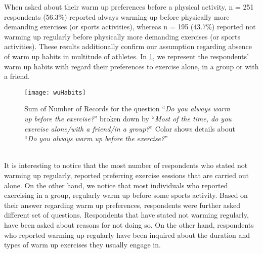 When asked about their warm up preferences before a physical activity, n = 251 respondents (56.3\%) reported always warming up before physically more demanding exercises (or sports activities), whereas n = 195 (43.7\%) reported not warming up regularly before physically more demanding exercises (or sports activities). These results additionally confirm our assumption regarding absence of warm up habits in multitude of athletes. In \ref{fig:wuHabits}, we represent the respondents' warm up habits with regard their preferences to exercise alone, in a group or with a friend. 
\begin{figure}[h]
    \centering
    \texttt{[image: wuHabits]}
    \caption{Sum of Number of Records for the question ``\textit{Do you always warm up before the exercise?}'' broken down by ``\textit{Most of the time, do you exercise alone/with a friend/in a group?}'' Color shows details about ``\textit{Do you always warm up before the exercise?}''}
    \label{fig:wuHabits}
\end{figure}\\
It is interesting to notice that the most number of respondents who stated not warming up regularly, reported preferring exercise sessions that are carried out alone. On the other hand, we notice that most individuals who reported exercising in a group, regularly warm up before some sports activity. Based on their answer regarding warm up preferences, respondents were further asked different set of questions. Respondents that have stated not warming regularly, have been asked about reasons for not doing so. On the other hand, respondents who reported warming up regularly have been inquired about the duration and types of warm up exercises they usually engage in.
